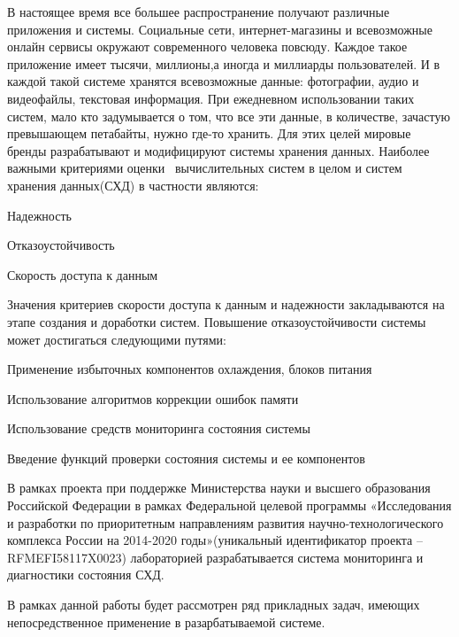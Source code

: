 \intro

В настоящее время все большее распространение получают различные приложения и системы. Социальные сети, интернет-магазины и всевозможные онлайн сервисы окружают современного человека повсюду. Каждое такое приложение имеет тысячи, миллионы,а иногда и миллиарды пользователей. И в каждой такой системе хранятся всевозможные данные: фотографии,  аудио и видеофайлы, текстовая информация. При ежедневном использовании таких систем, мало кто задумывается о том, что все эти данные, в количестве, зачастую превышающем петабайты, нужно где-то хранить. Для этих целей мировые бренды разрабатывают и модифицируют системы хранения данных. Наиболее важными критериями оценки~\cite{reliability} вычислительных систем в целом и систем хранения данных(СХД) в частности являются: 
\begin{itemize*}
	\item{Надежность}
	\item{Отказоустойчивость}
	\item{Скорость доступа к данным}
\end{itemize*}	
Значения критериев скорости доступа к данным и надежности закладываются на этапе создания и доработки систем. Повышение отказоустойчивости системы может достигаться следующими путями:
\begin{itemize*}
	\item{Применение избыточных компонентов охлаждения, блоков питания}
	\item{Использование алгоритмов коррекции ошибок памяти}
	\item{Использование средств мониторинга состояния системы}
	\item{Введение функций проверки состояния системы и ее компонентов}
\end{itemize*}	

В рамках проекта при поддержке Министерства науки и высшего образования Российской Федерации  в рамках Федеральной целевой программы «Исследования и разработки по приоритетным направлениям развития научно-технологического комплекса России на 2014-2020 годы»(уникальный идентификатор проекта  – RFMEFI58117X0023) лабораторией разрабатывается система мониторинга и диагностики состояния СХД.

В рамках данной работы будет рассмотрен ряд прикладных задач, имеющих непосредственное применение в разарбатываемой системе. 

